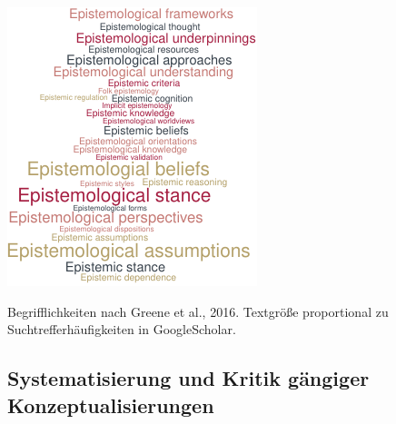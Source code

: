 \documentclass[]{tufte-handout}
\begin{document}
\begin{marginfigure}
\includegraphics{Handout_files/figure-latex/fig-margin1-1} \caption[Begrifflichkeiten nach Greene et al]{Begrifflichkeiten nach Greene et al., 2016. Textgröße proportional zu Suchtrefferhäufigkeiten in GoogleScholar.}\label{fig:fig-margin1}
\end{marginfigure}

\subsection{Systematisierung und Kritik gängiger
Konzeptualisierungen}\label{systematisierung-und-kritik-gangiger-konzeptualisierungen}
\end{document}
